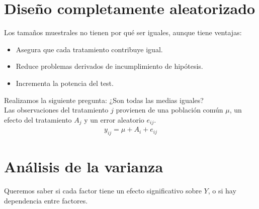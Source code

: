 \documentclass{article}
\begin{document}
\section{Diseño completamente aleatorizado}
Los tamaños muestrales no tienen por qué ser iguales, aunque tiene ventajas:
\begin{itemize}
	\item Asegura que cada tratamiento contribuye igual.
	\item Reduce problemas derivados de incumplimiento de hipótesis.
	\item Incrementa la potencia del test.
\end{itemize}
Realizamos la siguiente pregunta: ¿Son todas las medias iguales?\\
Las observaciones del tratamiento $j$  provienen de una población común $\mu$,
un efecto del tratamiento $A_{j}$ y un error aleatorio $e_{ij}$.
\begin{equation}
	\begin{split}
		y_{ij}=\mu + A_{i} + e_{ij}
	\end{split}
\end{equation}
\section{Análisis de la varianza}
Queremos saber si cada factor tiene un efecto significativo sobre $Y$, o si hay
dependencia entre factores.
\end{document}
